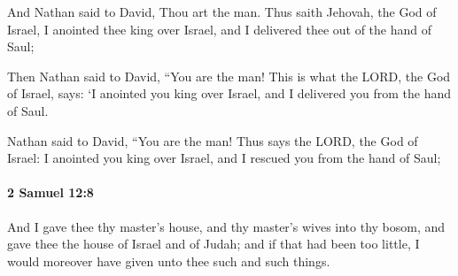 			\begin{versebox}
					\item[BHS] 
					\item[ASV] And Nathan said to David, Thou art the man. Thus saith Jehovah, the God of Israel, I anointed thee king over Israel, and I delivered thee out of the hand of Saul;
					\item[NIV] Then Nathan said to David, “You are the man! This is what the LORD, the God of Israel, says: ‘I anointed you king over Israel, and I delivered you from the hand of Saul.
					\item[NRSV] Nathan said to David, “You are the man! Thus says the LORD, the God of Israel: I anointed you king over Israel, and I rescued you from the hand of Saul;
			\end{versebox}

		\paragraph{2 Samuel 12:8} %
			\label{2SAMUEL-12-8}

			And I gave thee thy master’s house, and thy master’s wives into thy bosom, and gave thee the house of Israel and of Judah; and if that had been too little, I would moreover have given unto thee such and such things.

